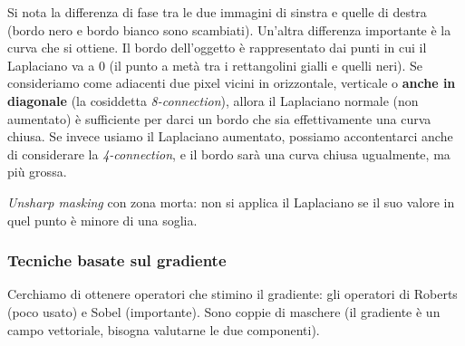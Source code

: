 \documentclass[a4paper,11pt]{article}
\begin{document}
Si nota la differenza di fase tra le due immagini di sinstra e quelle di destra (bordo nero e bordo bianco sono scambiati).
Un'altra differenza importante è la curva che si ottiene. Il bordo dell'oggetto è rappresentato dai punti in cui il Laplaciano va a 0 (il punto a metà
tra i rettangolini gialli e quelli neri).
Se consideriamo come adiacenti due pixel vicini in orizzontale, verticale o \textbf{anche in diagonale} (la cosiddetta \textit{8-connection}),
allora il Laplaciano normale (non aumentato) è sufficiente per darci un bordo che sia effettivamente una curva chiusa.
Se invece usiamo il Laplaciano aumentato, possiamo accontentarci anche di considerare la \textit{4-connection}, e il bordo sarà una curva
chiusa ugualmente, ma più grossa.
\par
\textit{Unsharp masking} con zona morta: non si applica il Laplaciano se il suo valore in quel punto è minore di una soglia.

\subsubsection{Tecniche basate sul gradiente}
Cerchiamo di ottenere operatori che stimino il gradiente: gli operatori di Roberts (poco usato) e Sobel (importante).
Sono coppie di maschere (il gradiente è un campo vettoriale, bisogna valutarne le due componenti).
\end{document}
